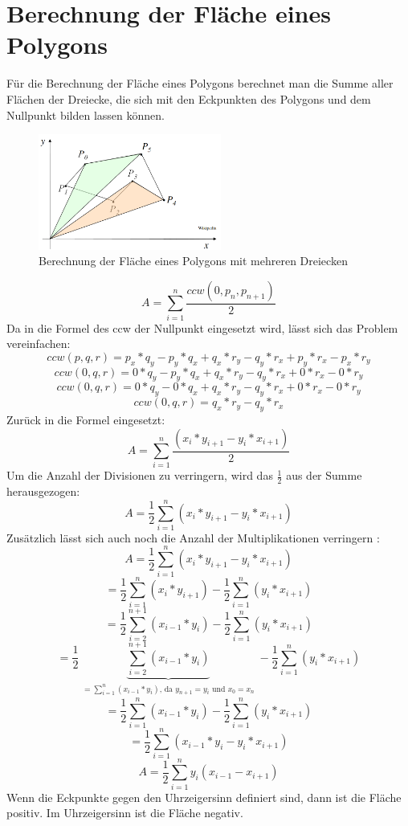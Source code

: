 \documentclass[conference]{IEEEtran}
\begin{document}
	\section{Berechnung der Fläche eines Polygons}
	Für die Berechnung der Fläche eines Polygons berechnet man die Summe aller Flächen der Dreiecke, die sich mit den Eckpunkten des Polygons und dem Nullpunkt bilden lassen können.
	\begin{figure}[h]
		\begin{center}
			\includegraphics[width=6cm]{AreaPoly.png}
			\caption{Berechnung der Fläche eines Polygons mit mehreren Dreiecken}
			\label{figure_3}
		\end{center}
	\end{figure}
	\[ A = \sum_{i=1}^{n} \frac{ccw(0,p_n,p_{n+1})}{2} \]
	Da in die Formel des ccw der Nullpunkt eingesetzt wird, lässt sich das Problem vereinfachen:
	\[ ccw(p,q,r) = p_x*q_y - p_y*q_x + q_x*r_y - q_y*r_x + p_y*r_x - p_x*r_y \]
	\[ ccw(0,q,r) = 0*q_y - p_y*q_x + q_x*r_y - q_y*r_x + 0*r_x - 0*r_y \]
	\[ ccw(0,q,r) = 0*q_y - 0*q_x + q_x*r_y - q_y*r_x + 0*r_x - 0*r_y \]
	\[ ccw(0,q,r) =  q_x*r_y - q_y*r_x  \]
	Zurück in die Formel eingesetzt:
	\[ A = \sum_{i=1}^{n} \frac{(x_{i}*y_{i+1}-y_{i}*x_{i+1})}{2}\]
	Um die Anzahl der Divisionen zu verringern, wird das $\frac{1}{2}$ aus der Summe herausgezogen:
	\[ A= \frac{1}{2}\sum_{i=1}^{n}(x_{i}*y_{i+1}-y_{i}*x_{i+1})\]
	Zusätzlich lässt sich auch noch die Anzahl der Multiplikationen verringern \cite{b1}:
	\[ A = \frac{1}{2}\sum_{i=1}^{n}(x_{i}*y_{i+1}-y_{i}*x_{i+1})\]	
	\[ = \frac{1}{2}\sum_{i=1}^{n}(x_{i}*y_{i+1}) - \frac{1}{2}\sum_{i=1}^{n}(y_{i}*x_{i+1})\]	
	\[ = \frac{1}{2}\sum_{i=2}^{n+1}(x_{i-1}*y_{i}) - \frac{1}{2}\sum_{i=1}^{n}(y_{i}*x_{i+1})\]
	\[ = \frac{1}{2} \underbrace{\sum_{i=2}^{n+1}(x_{i-1}*y_i)}_{\substack{ = \sum_{i=1}^{n}(x_{i-1}*y_{i})  \text{, da } y_{n+1}=y_i \text{ und } x_0=x_n}} - \frac{1}{2}\sum_{i=1}^{n}(y_i*x_{i+1})\]
	\[ = \frac{1}{2} \sum_{i=1}^{n}(x_{i-1}*y_{i}) - \frac{1}{2}\sum_{i=1}^{n}(y_i*x_{i+1})\]
	\[ = \frac{1}{2}\sum_{i=1}^{n}(x_{i-1}*y_{i}-y_{i}*x_{i+1})\]
	\[ A = \frac{1}{2}\sum_{i=1}^{n} y_i(x_{i-1}-x_{i+1})\]
	Wenn die Eckpunkte gegen den Uhrzeigersinn definiert sind, dann ist die Fläche positiv. Im Uhrzeigersinn ist die Fläche negativ.
	
\end{document}
